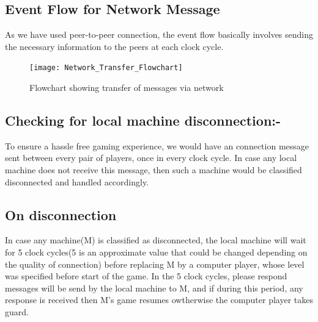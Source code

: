 \documentclass{article}
\begin{document}
\subsection{Event Flow for Network Message}
As we have used peer-to-peer connection, the event flow basically involves sending the necessary information to the peers at each clock cycle. 
\newline
\begin{figure}[h!]
    \centering
    \texttt{[image: Network\_Transfer\_Flowchart]}
    \caption{Flowchart showing transfer of messages via network}
\end{figure}
\subsection{Checking for local machine disconnection:-}
To ensure a hassle free gaming experience, we would have an connection message sent between every pair of players, once in every clock cycle. In case any local machine does not receive this message, then such a machine would be classified disconnected and handled accordingly.
\subsection{On disconnection}
In case any machine(M) is classified as disconnected, the local machine will wait for 5 clock cycles(5 is an approximate value that could be changed depending on the quality of connection) before replacing M by a computer player, whose level was specified before start of the game. In the 5 clock cycles, please respond messages will be send by the local machine to M, and if during this period, any response is received then M's game resumes owtherwise the computer player takes guard.




\end{document}
